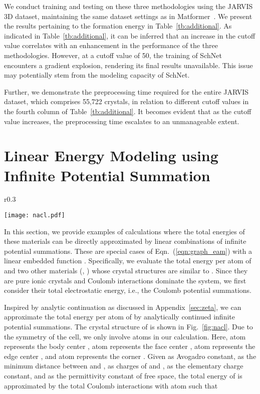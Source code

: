 \documentclass[nohyperref]{article}
\theoremstyle{plain}
\theoremstyle{definition}
\theoremstyle{remark}
\begin{document}
We conduct training and testing on these three methodologies using the JARVIS 3D dataset, maintaining the same dataset settings as in Matformer~\citep{yan2022periodic}. We present the results pertaining to the formation energy in Table~\ref{tb:additional}. As indicated in Table~\ref{tb:additional}, it can be inferred that an increase in the cutoff value correlates with an enhancement in the performance of the three methodologies. However, at a cutoff value of 50, the training of SchNet encounters a gradient explosion, rendering its final results unavailable. This issue may potentially stem from the modeling capacity of SchNet.

Further, we demonstrate the preprocessing time required for the entire JARVIS dataset, which comprises 55,722 crystals, in relation to different cutoff values in the fourth column of Table~\ref{tb:additional}. It becomes evident that as the cutoff value increases, the preprocessing time escalates to an unmanageable extent.


\section{Linear Energy Modeling using Infinite Potential Summation}
\label{born-lande}

\begin{wrapfigure}{r}{0.3\textwidth} 
\vspace{-10pt}
  \begin{center}
    \texttt{[image: nacl.pdf]}
    \vspace{-20pt}

    \caption{Crystal structure of .}
    \label{fig:nacl}
  \end{center}
  \vspace{-20pt}
\end{wrapfigure} In this section, we provide examples of calculations where the total energies of these materials can be directly approximated by linear combinations of infinite potential summations. These are special cases of Eqn.~(\ref{eqn:graph_eam}) with a linear embedded function . Specifically, we evaluate the total energy per atom of  and two other materials (, ) whose crystal structures are similar to . Since they are pure ionic crystals and Coulomb interactions dominate the system, we first consider their total electrostatic energy, i.e., the Coulomb potential summations. 

Inspired by analytic continuation as discussed in Appendix~\ref{sec:zeta}, we can approximate the total energy per atom of  by analytically continued infinite potential summations. The crystal structure of  is shown in Fig.~\ref{fig:nacl}. Due to the symmetry of the  cell, we only involve atoms  in our calculation. Here, atom  represents the body center , atom  represents the face center , atom  represents the edge center , and atom  represents the corner . Given  as Avogadro constant,  as the minimum distance between  and ,  as charges of  and ,  as the elementary charge constant, and  as the permittivity constant of free space, the total energy of  is approximated by the total Coulomb interactions with atom  such that
\end{document}
